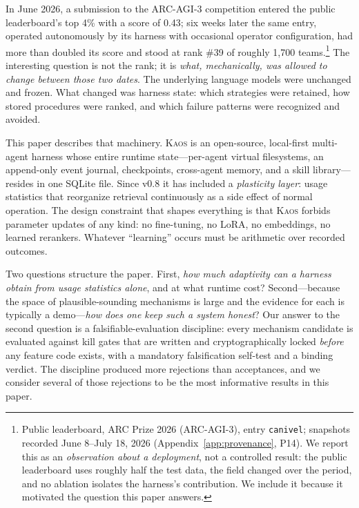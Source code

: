 \documentclass[11pt]{article}
\newcommand{\kaos}{\textsc{Kaos}}
\begin{document}
In June 2026, a submission to the ARC-AGI-3 competition entered the public leaderboard's top 4\% with a score of 0.43; six weeks later the same entry, operated autonomously by its harness with occasional operator configuration, had more than doubled its score and stood at rank \#39 of roughly 1{,}700 teams.\footnote{Public leaderboard, ARC Prize 2026 (ARC-AGI-3), entry \texttt{canivel}; snapshots recorded June 8--July 18, 2026 (Appendix~\ref{app:provenance}, P14). We report this as an \emph{observation about a deployment}, not a controlled result: the public leaderboard uses roughly half the test data, the field changed over the period, and no ablation isolates the harness's contribution. We include it because it motivated the question this paper answers.} The interesting question is not the rank; it is \emph{what, mechanically, was allowed to change between those two dates}. The underlying language models were unchanged and frozen. What changed was harness state: which strategies were retained, how stored procedures were ranked, and which failure patterns were recognized and avoided.

This paper describes that machinery. \kaos{} is an open-source, local-first multi-agent harness whose entire runtime state---per-agent virtual filesystems, an append-only event journal, checkpoints, cross-agent memory, and a skill library---resides in one SQLite file. Since v0.8 it has included a \emph{plasticity layer}: usage statistics that reorganize retrieval continuously as a side effect of normal operation. The design constraint that shapes everything is that \kaos{} forbids parameter updates of any kind: no fine-tuning, no LoRA, no embeddings, no learned rerankers. Whatever ``learning'' occurs must be arithmetic over recorded outcomes.

Two questions structure the paper. First, \emph{how much adaptivity can a harness obtain from usage statistics alone}, and at what runtime cost? Second---because the space of plausible-sounding mechanisms is large and the evidence for each is typically a demo---\emph{how does one keep such a system honest}? Our answer to the second question is a falsifiable-evaluation discipline: every mechanism candidate is evaluated against kill gates that are written and cryptographically locked \emph{before} any feature code exists, with a mandatory falsification self-test and a binding verdict. The discipline produced more rejections than acceptances, and we consider several of those rejections to be the most informative results in this paper.
\end{document}
